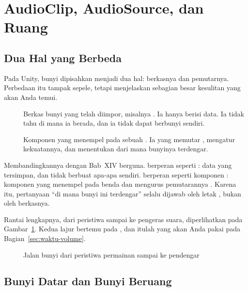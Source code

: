 \section{AudioClip, AudioSource, dan Ruang}
\label{sec:audioclip-audiosource}

\subsection{Dua Hal yang Berbeda}

Pada Unity, bunyi dipisahkan menjadi dua hal: berkasnya dan pemutarnya.
Perbedaan itu tampak sepele, tetapi menjelaskan sebagian besar kesulitan yang
akan Anda temui.

\begin{description}
  \item[] Berkas bunyi yang telah diimpor, misalnya
        . Ia hanya berisi data. Ia tidak tahu di mana ia
        berada, dan ia tidak dapat berbunyi sendiri.
  \item[] Komponen yang menempel pada sebuah
        . Ia yang memutar , mengatur
        kekuatannya, dan menentukan dari mana bunyinya terdengar.
\end{description}

Membandingkannya dengan Bab~XIV berguna.  berperan seperti
: data yang tersimpan, dan tidak berbuat apa-apa
sendiri.  berperan seperti komponen :
komponen yang menempel pada benda dan mengurus pemutarannya
\cite{unity-manual-import}. Karena itu,
pertanyaan ``di mana bunyi ini terdengar'' selalu dijawab oleh letak
, bukan oleh berkasnya.

Rantai lengkapnya, dari peristiwa sampai ke pengeras suara, diperlihatkan pada
Gambar~\ref{fig:rantai-bunyi}. Kedua lajur bertemu pada
, dan itulah yang akan Anda pakai pada
Bagian~\ref{sec:waktu-volume}.

\begin{figure}[htbp]
\centering

\caption{Jalan bunyi dari peristiwa permainan sampai ke pendengar}
\label{fig:rantai-bunyi}
\end{figure}

\subsection{Bunyi Datar dan Bunyi Beruang}

